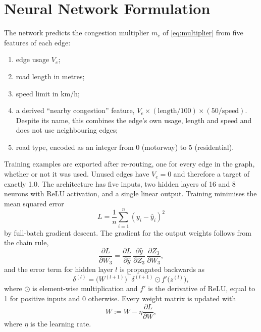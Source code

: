 \documentclass[12pt]{report}
\begin{document}
\section{Neural Network Formulation}
\label{sec:nn-method}

The network predicts the congestion multiplier $m_e$ of \cref{eq:multiplier} from five features of each edge:

\begin{enumerate}
  \item edge usage $V_e$;
  \item road length in metres;
  \item speed limit in km/h;
  \item a derived ``nearby congestion'' feature, $V_e \times (\text{length}/100) \times (50/\text{speed})$. Despite its name, this combines the edge's own usage, length and speed and does not use neighbouring edges;
  \item road type, encoded as an integer from 0 (motorway) to 5 (residential).
\end{enumerate}

Training examples are exported after re-routing, one for every edge in the graph, whether or not it was used. Unused edges have $V_e = 0$ and therefore a target of exactly 1.0. The architecture has five inputs, two hidden layers of 16 and 8 neurons with ReLU activation, and a single linear output. Training minimises the mean squared error
\begin{equation}
L = \frac{1}{n}\sum_{i=1}^{n}(y_i - \hat{y}_i)^2
\end{equation}
by full-batch gradient descent. The gradient for the output weights follows from the chain rule,
\begin{equation}
\frac{\partial L}{\partial W_3} = \frac{\partial L}{\partial \hat{y}}\,\frac{\partial \hat{y}}{\partial Z_3}\,\frac{\partial Z_3}{\partial W_3},
\end{equation}
and the error term for hidden layer $l$ is propagated backwards as
\begin{equation}
\delta^{(l)} = \big(W^{(l+1)}\big)^{\!\top} \delta^{(l+1)} \odot f'\big(z^{(l)}\big),
\end{equation}
where $\odot$ is element-wise multiplication and $f'$ is the derivative of ReLU, equal to 1 for positive inputs and 0 otherwise. Every weight matrix is updated with
\begin{equation}
W := W - \eta \frac{\partial L}{\partial W},
\end{equation}
where $\eta$ is the learning rate.
\end{document}
